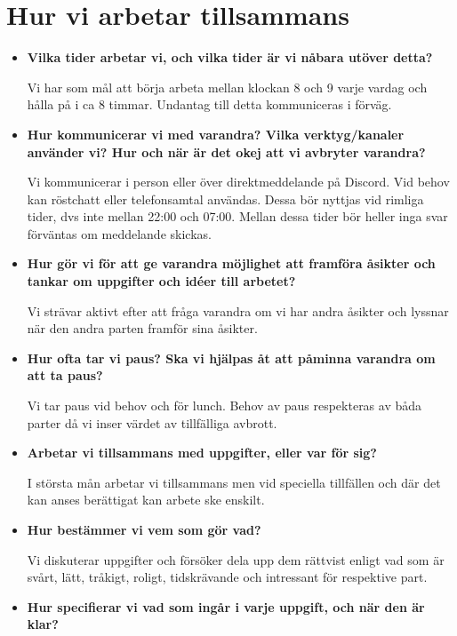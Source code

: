 \documentclass{mall}
\begin{document}
\section{Hur vi arbetar tillsammans}

\begin{itemize}
\item \textbf{Vilka tider arbetar vi, och vilka tider är vi nåbara utöver detta?}

  Vi har som mål att börja arbeta mellan klockan 8 och 9 varje vardag och hålla på i ca 8 timmar. Undantag till detta kommuniceras i förväg. 

\item \textbf{Hur kommunicerar vi med varandra? Vilka verktyg/kanaler använder vi? Hur och när är det okej att vi avbryter varandra?}

  Vi kommunicerar i person eller över direktmeddelande på Discord. Vid behov kan röstchatt eller telefonsamtal användas. Dessa bör nyttjas vid rimliga tider, dvs inte mellan 22:00 och 07:00. Mellan dessa tider bör heller inga svar förväntas om meddelande skickas.

\item \textbf{Hur gör vi för att ge varandra möjlighet att framföra åsikter och tankar om uppgifter och idéer till arbetet?}

  Vi strävar aktivt efter att fråga varandra om vi har andra åsikter och lyssnar när den andra parten framför sina åsikter.

\item \textbf{Hur ofta tar vi paus? Ska vi hjälpas åt att påminna varandra om att ta paus?}

  Vi tar paus vid behov och för lunch. Behov av paus respekteras av båda parter då vi inser värdet av tillfälliga avbrott.

\item \textbf{Arbetar vi tillsammans med uppgifter, eller var för sig?}

  I största mån arbetar vi tillsammans men vid speciella tillfällen och där det kan anses berättigat kan arbete ske enskilt.

\item \textbf{Hur bestämmer vi vem som gör vad?}

  Vi diskuterar uppgifter och försöker dela upp dem rättvist enligt vad som är svårt, lätt, tråkigt, roligt, tidskrävande och intressant för respektive part.

\item \textbf{Hur specifierar vi vad som ingår i varje uppgift, och när den är klar?}


\end{itemize}
\end{document}
